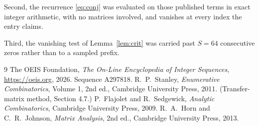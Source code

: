 \documentclass[11pt,a4paper]{article}
\theoremstyle{plain}
\theoremstyle{definition}
\begin{document}
Second, the recurrence \eqref{eq:conj} was evaluated on those published terms in exact
integer arithmetic, with no matrices involved, and vanishes at every index the entry claims.

Third, the vanishing test of Lemma~\ref{lem:crit} was carried past $S=64$ consecutive
zeros rather than to a sampled prefix.

\begin{thebibliography}{9}
 The OEIS Foundation, \emph{The On-Line Encyclopedia of Integer
Sequences}, \url{https://oeis.org}, 2026. Sequence A297818.
 R.~P.~Stanley, \emph{Enumerative Combinatorics}, Volume 1, 2nd ed.,
Cambridge University Press, 2011. (Transfer-matrix method, Section 4.7.)
 P.~Flajolet and R.~Sedgewick, \emph{Analytic Combinatorics}, Cambridge
University Press, 2009.
 R.~A.~Horn and C.~R.~Johnson, \emph{Matrix Analysis}, 2nd ed., Cambridge
University Press, 2013.
\end{thebibliography}
\end{document}
